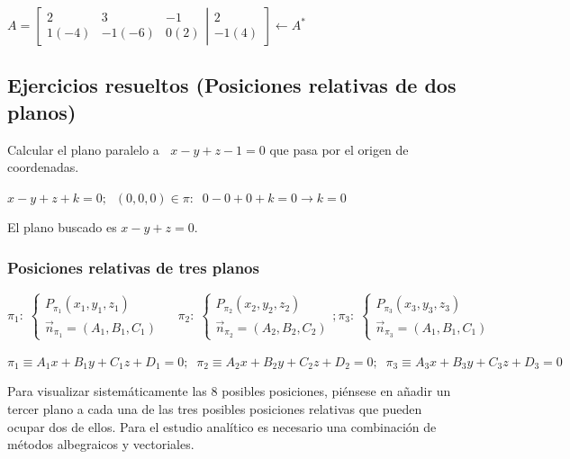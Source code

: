 \noindent \textcolor{gris}{ $A=\left[ \begin{matrix} 2&3&-1 \\ 1(-4)&-1(-6)&0(2) \end{matrix} \right| \left. \begin{matrix} 2 \\ -1(4) \end{matrix} \right] \leftarrow A^*$}

\subsection{Ejercicios resueltos (Posiciones relativas de dos planos)}

\begin{ejre}
Calcular el plano paralelo a $\;\;x-y+z-1=0$ que pasa por el origen de coordenadas.	
\end{ejre}
\begin{proofw}\renewcommand{\qedsymbol}{$\diamond$}
	$x-y+z+k=0; \;\; (0,0,0) \in \pi:\; \; 0-0+0+k=0 \to k=0$
	
\noindent El plano buscado es $x-y+z=0$.
\end{proofw}


\subsubsection{Posiciones relativas de tres planos}


\noindent \footnotesize{$\pi_1: \;\begin{cases} P_{\pi_1}(x_1,y_1,z_1) \\ \vec n_{\pi_1}=(A_1,B_1,C_1) \end{cases} \; \quad \pi_2:\; \begin{cases}  P_{\pi_2}(x_2,y_2,z_2) \\ \vec n_{\pi_2}=(A_2,B_2,C_2)\end{cases};  \pi_3 : \; \begin{cases}  P_{\pi_3}(x_3,y_3,z_3) \\ \vec n_{\pi_3}=(A_1,B_1,C_1)\end{cases}$ }

\noindent \tiny{$\pi_1\equiv A_1x+B_1y+C_1z+D_1=0; \;\;\pi_2\equiv A_2x+B_2y+C_2z+D_2=0; \;\;\pi_3\equiv A_3x+B_3y+C_3z+D_3=0$}

\normalsize{Para} visualizar sistemáticamente las $8$ posibles posiciones, piénsese en añadir un tercer plano a cada una de las tres posibles posiciones relativas que pueden ocupar dos de ellos. Para el estudio analítico es necesario una combinación de métodos albegraicos y vectoriales.


